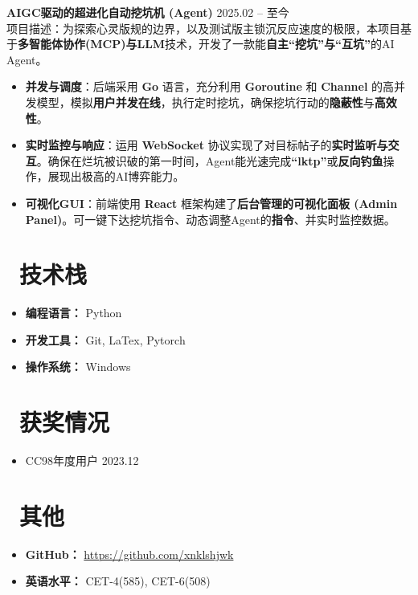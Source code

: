 \documentclass[11pt]{article}
\newlength{\interProjectSpacing}
\newcommand{\projectsep}{\vspace{\interProjectSpacing}}
\newlength{\intraProjectTitleSep}
\newcommand{\titlebreak}{\\[\intraProjectTitleSep]}
\newlength{\intraProjectListTopSep}
\begin{document}
\projectsep

\textbf{AIGC驱动的超进化自动挖坑机 (Agent)} \hfill 2025.02 -- 至今 \titlebreak
项目描述：为探索心灵版规的边界，以及测试版主锁沉反应速度的极限，本项目基于\textbf{多智能体协作(MCP)与LLM}技术，开发了一款能\textbf{自主“挖坑”与“互坑”}的AI Agent。
\begin{itemize}[nosep, topsep=\intraProjectListTopSep]
    \item \textbf{并发与调度}：后端采用 \textbf{Go} 语言，充分利用 \textbf{Goroutine} 和 \textbf{Channel} 的高并发模型，模拟\textbf{用户并发在线}，执行定时挖坑，确保挖坑行动的\textbf{隐蔽性}与\textbf{高效性}。
    \item \textbf{实时监控与响应}：运用 \textbf{WebSocket} 协议实现了对目标帖子的\textbf{实时监听与交互}。确保在烂坑被识破的第一时间，Agent能光速完成\textbf{“lktp”}或\textbf{反向钓鱼}操作，展现出极高的AI博弈能力。
    \item \textbf{可视化GUI}：前端使用 \textbf{React} 框架构建了\textbf{后台管理的可视化面板 (Admin Panel)}。可一键下达挖坑指令、动态调整Agent的\textbf{指令}、并实时监控数据。
\end{itemize}

\section{\makebox[\widthof{\faCogs}][c]{\color{CVBlue}\faCogs}\ 技术栈}
\begin{itemize}[nosep]
    \item \textbf{编程语言：} Python
    \item \textbf{开发工具：} Git, LaTex, Pytorch
    \item \textbf{操作系统：} Windows
\end{itemize}
\section{\makebox[\widthof{\faGraduationCap}][c]{\color{CVBlue}\faList}\ 获奖情况}
\begin{itemize}
    \item CC98年度用户 \hfill 2023.12
    
\end{itemize}
    
\section{\makebox[\widthof{\faInfo}][c]{\color{CVBlue}\faInfo}\ 其他}
\begin{itemize}[parsep=0.5ex]

    \item \textbf{GitHub：} \href{https://github.com/xnklshjwk}{https://github.com/xnklshjwk} 
    \item \textbf{英语水平：} CET-4(585), CET-6(508)
\end{itemize}
\end{document}
